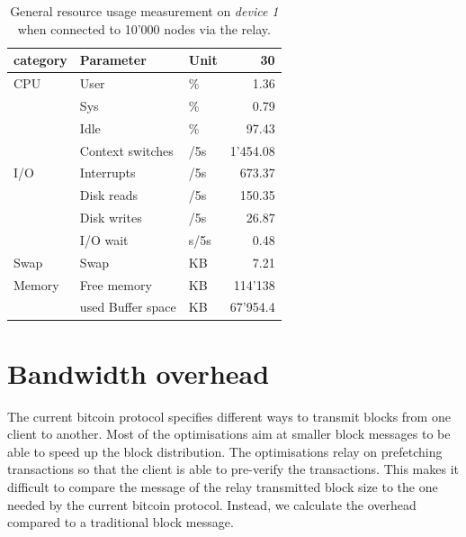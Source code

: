 \begin{table}[tbp]
\begin{center}	
\begin{tabular}{l|l|l|r }
\textbf{category} & \textbf{Parameter} & \textbf{Unit} & \textbf{30} \\
\hline
CPU & User & \%             & 1.36 \\
    & Sys  & \%             & 0.79  \\
    & Idle & \%             & 97.43 \\
    & Context switches & /5s  & 1'454.08 \\
\hline
I/O & Interrupts & /5s       & 673.37 \\
    & Disk reads   & /5s     & 150.35 \\
    & Disk writes   & /5s    & 26.87 \\
    & I/O wait     & s/5s       & 0.48 \\
\hline
Swap & Swap   & KB          & 7.21 \\
\hline
Memory & Free memory  & KB          & 114'138 \\
       & used Buffer space  & KB    & 67'954.4 \\
\end{tabular}
\caption[General resource measurements of the modified bitcoin client.]{General resource usage measurement on \textit{device 1} when connected to 10'000 nodes via the relay.}
\label{tab:evaluation:generalresources}
\end{center}
\end{table}











\section{Bandwidth overhead\label{evaluation:messages}}
The current bitcoin protocol specifies different ways to transmit blocks from one client to another. Most of the optimisations aim at smaller block messages to be able to speed up the block distribution. The optimisations relay on prefetching transactions so that the client is able to pre-verify the transactions. This makes it difficult to compare the message of the relay transmitted block size to the one needed by the current bitcoin protocol. Instead, we calculate the overhead compared to a traditional block message.
